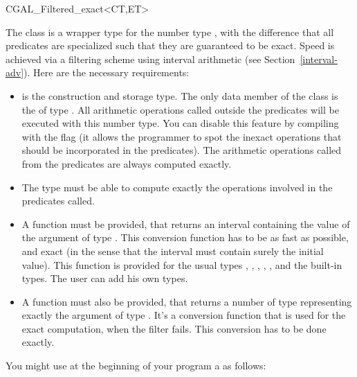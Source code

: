 \begin{ccClass} {CGAL_Filtered_exact<CT,ET>}
\label{filter}

The class  is a wrapper type for the number
type , with the difference
that all predicates are specialized such that they are guaranteed to be exact.
Speed is achieved via a filtering scheme using interval arithmetic (see
Section~\ref{interval-adv}).  Here are the necessary requirements:

\begin{itemize}
\item {} is the construction and storage type.  The only data member of
      the class  is the  of type
      .
      All arithmetic operations called
      outside the predicates will be executed with this number type.  You can
      disable this feature by compiling with the flag
       (it allows the programmer
      to spot the inexact operations that should be incorporated in the
      predicates).
      The arithmetic operations called from the predicates are always computed
      exactly.
\item The  type must be able to compute exactly the operations involved
      in the predicates called.
\item A  function must
      be provided, that returns an interval containing the value of the
      argument of type .
      This conversion function has to be as fast as possible, and exact (in the
      sense that the interval must contain surely the initial value).  This
      function is provided for the usual types , ,
      , , , and the
      built-in types.  The user can add his own types.
\item A  function must also be provided, that
      returns a number of type  representing exactly the argument of
      type .  It's a conversion function that is used for the exact
      computation, when the filter fails.
      This conversion has to be done exactly.
\end{itemize}

\ccExample

You might use at the beginning of your program a  as follows:


\end{ccClass}
